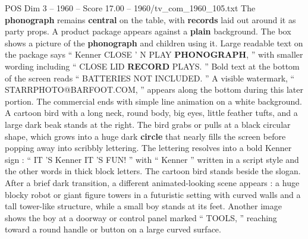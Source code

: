 \begin{textsample}{POS Dim 3 – 1960 – Score 17.00 – 1960/tv\_com\_1960\_105.txt}
The \textbf{phonograph} remains \textbf{central} on the table, with \textbf{records} laid out around it as party props.
A product package appears against a \textbf{plain} background.
The box shows a picture of the \textbf{phonograph} and children using it.
Large readable text on the package says “ Kenner CLOSE ’ N PLAY \textbf{PHONOGRAPH}, ” with smaller wording including “ CLOSE LID \textbf{RECORD} PLAYS. ” Bold text at the bottom of the screen reads “ BATTERIES NOT INCLUDED. ” A visible watermark, “ STARRPHOTO@BARFOOT.COM, ” appears along the bottom during this later portion.
The commercial ends with simple line animation on a white background.
A cartoon bird with a long neck, round body, big eyes, little feather tufts, and a large dark beak stands at the right.
The bird grabs or pulls at a black circular shape, which grows into a huge dark \textbf{circle} that nearly fills the screen before popping away into scribbly lettering.
The lettering resolves into a bold Kenner sign : “ IT ’S Kenner IT ’S FUN! ” with “ Kenner ” written in a script style and the other words in thick block letters.
The cartoon bird stands beside the slogan.
After a brief dark transition, a different animated-looking scene appears : a huge blocky robot or giant figure towers in a futuristic setting with curved walls and a tall tower-like structure, while a small boy stands at its feet.
Another image shows the boy at a doorway or control panel marked “ TOOLS, ” reaching toward a round handle or button on a large curved surface.

\end{textsample}
